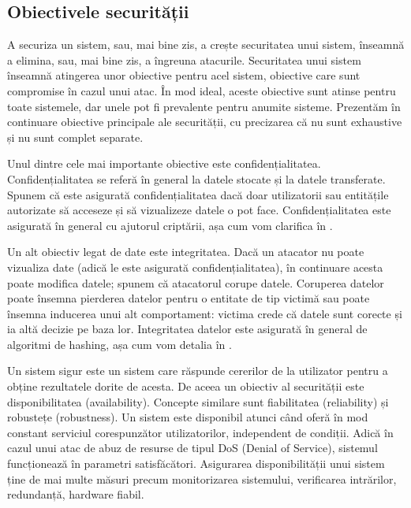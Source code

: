 \subsection{Obiectivele securității}
\label{sec:sec:objectives}

A securiza un sistem, sau, mai bine zis, a crește securitatea unui sistem, înseamnă a elimina, sau, mai bine zis, a îngreuna atacurile. Securitatea unui sistem înseamnă atingerea unor obiective pentru acel sistem, obiective care sunt compromise în cazul unui atac. În mod ideal, aceste obiective sunt atinse pentru toate sistemele, dar unele pot fi prevalente pentru anumite sisteme. Prezentăm în continuare obiective principale ale securității, cu precizarea că nu sunt exhaustive și nu sunt complet separate.

Unul dintre cele mai importante obiective este confidențialitatea. Confidențialitatea se referă în general la datele stocate și la datele transferate. Spunem că este asigurată confidențialitatea dacă doar utilizatorii sau entitățile autorizate să acceseze și să vizualizeze datele o pot face. Confidențialitatea este asigurată în general cu ajutorul criptării, așa cum vom clarifica în .

Un alt obiectiv legat de date este integritatea. Dacă un atacator nu poate vizualiza date (adică le este asigurată confidențialitatea), în continuare acesta poate modifica datele; spunem că atacatorul corupe datele. Coruperea datelor poate însemna pierderea datelor pentru o entitate de tip victimă sau poate însemna inducerea unui alt comportament: victima crede că datele sunt corecte și ia altă decizie pe baza lor. Integritatea datelor este asigurată în general de algoritmi de hashing, așa cum vom detalia în .

Un sistem sigur este un sistem care răspunde cererilor de la utilizator pentru a obține rezultatele dorite de acesta. De aceea un obiectiv al securității este disponibilitatea (availability). Concepte similare sunt fiabilitatea (reliability) și robustețe (robustness). Un sistem este disponibil atunci când oferă în mod constant serviciul corespunzător utilizatorilor, independent de condiții. Adică în cazul unui atac de abuz de resurse de tipul DoS (Denial of Service), sistemul funcționează în parametri satisfăcători. Asigurarea disponibilității unui sistem ține de mai multe măsuri precum monitorizarea sistemului, verificarea intrărilor, redundanță, hardware fiabil.

